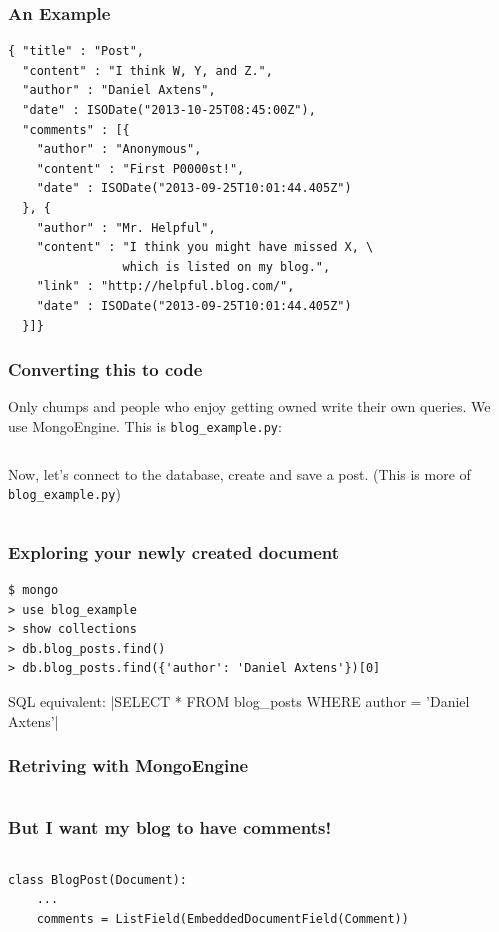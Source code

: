 \documentclass{beamer}
\begin{document}
\begin{frame}[fragile]
\frametitle{An Example}
\begin{verbatim}
{ "title" : "Post",
  "content" : "I think W, Y, and Z.",
  "author" : "Daniel Axtens",
  "date" : ISODate("2013-10-25T08:45:00Z"),
  "comments" : [{
    "author" : "Anonymous",
    "content" : "First P0000st!",
    "date" : ISODate("2013-09-25T10:01:44.405Z")
  }, {
    "author" : "Mr. Helpful",
    "content" : "I think you might have missed X, \
                which is listed on my blog.",
    "link" : "http://helpful.blog.com/",
    "date" : ISODate("2013-09-25T10:01:44.405Z")
  }]}
\end{verbatim}
\end{frame}

\begin{frame}[fragile]
  \frametitle{Converting this to code}

  Only chumps and people who enjoy getting owned write their own
  queries. We use MongoEngine. This is \texttt{blog\_example.py}:

  \inputminted[firstline=1,lastline=11]{python}{../steps/02-database/blog_example.py}
\end{frame}

\begin{frame}[fragile]
  Now, let's connect to the database, create and save a post. (This is
  more of \texttt{blog\_example.py})

  \inputminted[firstline=13,lastline=21]{python}{../steps/02-database/blog_example.py}
\end{frame}

\begin{frame}[fragile]
  \frametitle{Exploring your newly created document}
\begin{verbatim}
$ mongo
> use blog_example
> show collections
> db.blog_posts.find()
> db.blog_posts.find({'author': 'Daniel Axtens'})[0]
\end{verbatim}
SQL equivalent:
 |SELECT * FROM blog_posts WHERE author = 'Daniel Axtens'|
\end{frame}

\begin{frame}
  \frametitle{Retriving with MongoEngine}
  \inputminted[firstline=22,lastline=35]{python}{../steps/02-database/blog_example.py}
\end{frame}

\begin{frame}[fragile]
  \frametitle{But I want my blog to have comments!}
  \inputminted[firstline=5,lastline=11]{python}{../steps/02-database/comment_example.py}
  \begin{verbatim}
class BlogPost(Document):
    ...
    comments = ListField(EmbeddedDocumentField(Comment))    
  \end{verbatim}
\end{frame}
\end{document}
